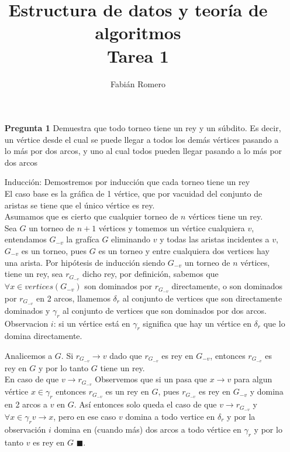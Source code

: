 \documentclass[12pt]{article}
\title{Estructura de datos y teoría de algoritmos\\
Tarea 1 }
\author{Fabián Romero}
\begin{document}
\lstset{language=python}
\maketitle

\begin{itemize}
  \item[\bf{Pregunta 1}] Demuestra que todo torneo tiene un rey y un súbdito. Es decir, un vértice desde el cual se puede llegar a todos los demás vértices pasando a lo más por dos arcos, y uno al cual todos pueden llegar pasando a lo más por dos arcos

  \item[Inducción:] 
    Demostremos por inducción que cada torneo tiene un rey\\
    El caso base es la gráfica de 1 vértice, que por vacuidad del conjunto de aristas se tiene que el único vértice es rey.\\
    Asumamos que es cierto que cualquier torneo de $n$ vértices tiene un rey.\\
    Sea $G$ un torneo de $n+1$ vértices y tomemos un vértice cualquiera $v$, entendamos $G_{-v}$ la grafíca $G$ eliminando $v$ y todas las aristas incidentes a $v$, $G_{-v}$ es un torneo, pues $G$ es un torneo y entre cualquiera dos vertices hay una arista.
    Por hipótesis de inducción siendo $G_{-v}$ un torneo de $n$ vértices, tiene un rey, sea $r_{G_{-v}}$ dicho rey, por definición, sabemos que $\forall x \in vertices(G_{-v})$ son dominados por $r_{G_{-v}}$ directamente, o son dominados por $r_{G_{-v}}$ en 2 arcos, llamemos $\delta_{r}$ al conjunto de vertices que son directamente dominados y $\gamma_{r}$ al conjunto de vertices que son dominados por dos arcos.  Observacion $i$:  si un vértice está en $\gamma_{r}$ significa que hay un vértice en $\delta_{r}$ que lo domina directamente.

Analicemos a $G$.
Si $r_{G_{-v}} \rightarrow v$ dado que $r_{G_{-v}}$ es rey en $G_{-v}$, entonces $r_{G_{-v}}$ es rey en $G$ y por lo tanto $G$ tiene un rey.\\
En caso de que $v \rightarrow r_{G_{-v}}$ Observemos que si un pasa que $x \rightarrow v$ para algun vértice $x \in \gamma_{r}$ entonces $r_{G_{-v}}$ es un rey en $G$, pues $r_{G_{-v}}$ es rey en $G_{-v}$ y domina en 2 arcos a $v$ en $G$.
Así entonces solo queda el caso de que $v \rightarrow r_{G_{-v}}$ y $\forall x \in \gamma_{r}  v \rightarrow x$, pero en ese caso $v$ domina a todo vertice en $\delta_{r}$ y por la observación $i$ domina en (cuando más) dos arcos a todo vértice en $\gamma_{r}$ y por lo tanto $v$ es rey en $G$ $\blacksquare$.\\


\end{itemize}
\end{document}
